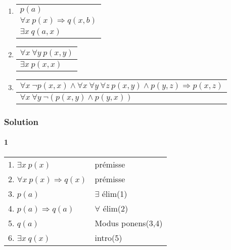 \begin{enumerate}
	\item \enter
\begin{flushleft}
\begin{tabular}{l}
$p(a)$ \\
$\forall x \ p(x) \Rightarrow q(x, b)$ \\
\hline
$\exists x \ q(a, x)$
\end{tabular}
\end{flushleft}

	\item \enter
\begin{flushleft}
\begin{tabular}{l}
$\forall x \ \forall y \ p(x, y)$ \\
\hline
$\exists x \ p(x, x)$
\end{tabular}
\end{flushleft}

	\item \enter
\begin{flushleft}
\begin{tabular}{l}
$\forall x \ \neg p(x, x) \land \forall x \ \forall y \ \forall z \ p(x, y) \land p(y, z) \Rightarrow p(x, z)$ \\
\hline
$\forall x \ \forall y \ \neg (p(x, y) \land p(y, x))$
\end{tabular}
\end{flushleft}

\end{enumerate}


    \subsubsection{Solution}
    
        \paragraph{1}
        
            \begin{tabular}{|l|l|}
            \hline
            1. $\exists x \  p(x)$ & prémisse \\
            2. $\forall x \  p(x) \Rightarrow q(x)$ & prémisse \\
            3. $p(a)$ & $\exists$ élim(1) \\
            4. $p(a) \Rightarrow q(a)$ & $\forall$ élim(2) \\ 
            5. $q(a)$ & Modus ponens(3,4) \\
            6. $\exists x \  q(x)$ & intro(5) \\
            \hline
            \end{tabular}
        
